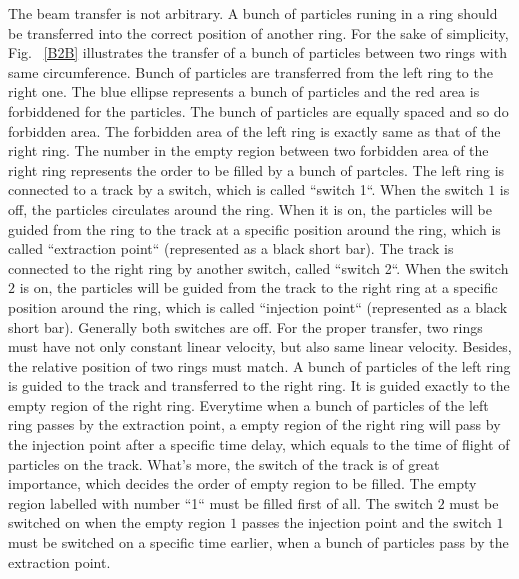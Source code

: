 The beam transfer is not arbitrary. A bunch of particles runing in a ring should be transferred into the correct position of another ring. For the sake of simplicity, Fig. ~\ref{B2B} illustrates the transfer of a bunch of particles between two rings with same circumference. Bunch of particles are transferred from the left ring to the right one. The blue ellipse represents a bunch of particles and the red area is forbiddened for the particles. The bunch of particles are equally spaced and so do forbidden area. The forbidden area of the left ring is exactly same as that of the right ring. The number in the empty region between two forbidden area of the right ring represents the order to be filled by a bunch of partcles. The left ring is connected to a track by a switch, which is called ``switch 1``. When the switch $1$ is off, the particles circulates around the ring. When it is on, the particles will be guided from the ring to the track at a specific position around the ring, which is called ``extraction point`` (represented as a black short bar). The track is connected to the right ring by another switch, called ``switch 2``. When the switch $2$ is on, the particles will be guided from the track to the right ring at a specific position around the ring, which is called ``injection point`` (represented as a black short bar). Generally both switches are off. For the proper transfer, two rings must have not only constant linear velocity, but also same linear velocity. Besides, the relative position of two rings must match. A bunch of particles of the left ring is guided to the track and transferred to the right ring. It is guided exactly to the empty region of the right ring. Everytime when a bunch of particles of the left ring passes by the extraction point, a empty region of the right ring will pass by the injection point after a specific time delay, which equals to the time of flight of particles on the track. What's more, the switch of the track is of great importance, which decides the order of empty region to be filled. The empty region labelled with number ``1`` must be filled first of all. The switch $2$ must be switched on when the empty region $1$ passes the injection point and the switch $1$ must be switched on a specific time earlier, when a bunch of particles pass by the extraction point. 

